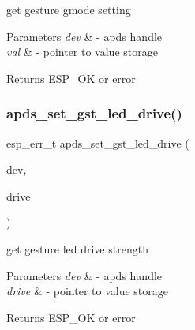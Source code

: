 \begin{DoxyItemize}
\item get gesture gmode setting 
\end{DoxyItemize}


\begin{DoxyParams}{Parameters}
{\em dev} & -\/ apds handle \\
\hline
{\em val} & -\/ pointer to value storage \\
\hline
\end{DoxyParams}
\begin{DoxyReturn}{Returns}
E\+S\+P\+\_\+\+OK or error 
\end{DoxyReturn}
\mbox{\label{group__APDS9960__GestureFunctions_gab65e85fbffa4a5a6155a18d2eac7ce44}} 
\subsubsection{\texorpdfstring{apds\+\_\+set\+\_\+gst\+\_\+led\+\_\+drive()}{apds\_set\_gst\_led\_drive()}}
{\footnotesize\ttfamily esp\+\_\+err\+\_\+t apds\+\_\+set\+\_\+gst\+\_\+led\+\_\+drive (\begin{DoxyParamCaption}\item[{\hyperlink{structAPDS9960__Driver}{A\+P\+D\+S\+\_\+\+D\+EV}}]{dev,  }\item[{apds\+\_\+led\+\_\+drive\+\_\+t $\ast$}]{drive }\end{DoxyParamCaption})}




\begin{DoxyItemize}
\item get gesture led drive strength 
\end{DoxyItemize}


\begin{DoxyParams}{Parameters}
{\em dev} & -\/ apds handle \\
\hline
{\em drive} & -\/ pointer to value storage \\
\hline
\end{DoxyParams}
\begin{DoxyReturn}{Returns}
E\+S\+P\+\_\+\+OK or error 
\end{DoxyReturn}
\mbox{\label{group__APDS9960__GestureFunctions_gaa0edf3a2043b3718b079b1a6adf301e9}} 
